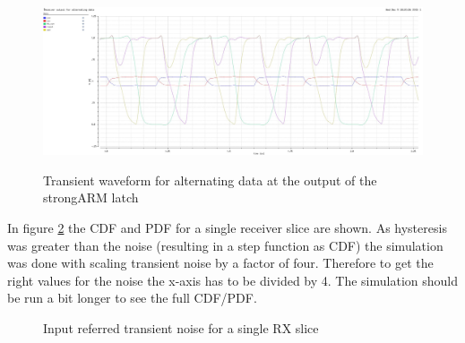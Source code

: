 \begin{figure}[H]
  \centering
  {\includegraphics[angle=90, scale=0.45]{img/output_alt_trans.jpg}}
  \caption{Transient waveform for alternating data at the output of the strongARM latch}
  \label{fig:strongARM_out}
\end{figure}

In figure \ref{fig:rx_slice_pdf_cdf} the CDF and PDF for a single receiver slice are shown. As hysteresis was greater than the noise (resulting in a step function as CDF) the simulation was done with scaling transient noise by a factor of four. Therefore to get the right values for the noise the x-axis has to be divided by 4. The simulation should be run a bit longer to see the full CDF/PDF.

\begin{figure}[H]
  \centering
  \caption{Input referred transient noise for a single RX slice}
  \label{fig:rx_slice_pdf_cdf}
\end{figure}

